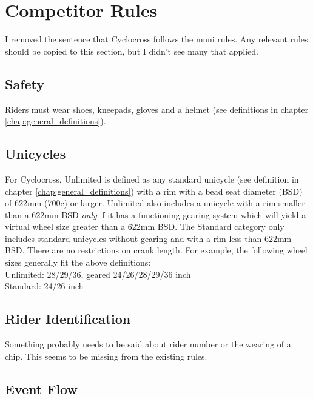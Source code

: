 \chapter{Competitor Rules}

\begin{framed}
I removed the sentence that Cyclocross follows the muni rules. Any relevant rules should be copied to this section, but I didn't see many that applied.
\end{framed}

\section{Safety}
Riders must wear shoes, kneepads, gloves and a helmet (see definitions in chapter \ref{chap:general_definitions}).

\section{Unicycles}

For Cyclocross, Unlimited is defined as any standard unicycle (see definition in chapter \ref{chap:general_definitions}) with a rim with a bead seat diameter (BSD) of 622mm (700c) or larger.
Unlimited also includes a unicycle with a rim smaller than a 622mm BSD {\em only} if it has a functioning gearing system which will yield a virtual wheel size greater than a 622mm BSD.
The Standard category only includes standard unicycles without gearing and with a rim less than 622mm BSD.
There are no restrictions on crank length.
For example, the following wheel sizes generally fit the above definitions: \\
Unlimited: 28/29/36, geared 24/26/28/29/36 inch \\
Standard: 24/26 inch

\section{Rider Identification}

\begin{framed}
Something probably needs to be said about rider number or the wearing of a chip.  This seems to be missing from the existing rules.
\end{framed}

\section{Event Flow}

